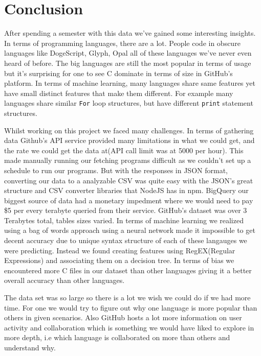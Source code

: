 \documentclass[11pt]{article}
\begin{document}
    \hypertarget{conclusion}{%
\section{Conclusion}\label{conclusion}}

After spending a semester with this data we've gained some interesting
insights. In terms of programming languages, there are a lot. People
code in obscure languages like DogeScript, Glyph, Opal all of these
languages we've never even heard of before. The big languages are still
the most popular in terms of usage but it's surprising for one to see C
dominate in terms of size in GitHub's platform. In terms of machine
learning, many languages share same features yet have small distinct
features that make them different. For example many languages share
similar \texttt{For} loop structures, but have different \texttt{print}
statement structures.

Whilst working on this project we faced many challenges. In terms of
gathering data Github's API service provided many limitations in what we
could get, and the rate we could get the data at(API call limit was at
5000 per hour). This made manually running our fetching programs
difficult as we couldn't set up a schedule to run our programs. But with
the responses in JSON format, converting our data to a analyzable CSV
was quite easy with the JSON's great structure and CSV converter
libraries that NodeJS has in npm. BigQuery our biggest source of data
had a monetary impedment where we would need to pay \$5 per every
terabyte queried from their service. GitHub's dataset was over 3
Terabytes total, tables sizes varied. In terms of machine learning we
realized using a bag of words approach using a neural network made it
impossible to get decent accuracy due to unique syntax structure of each
of these langauges we were predicting. Instead we found creating
features using RegEX(Regular Expressions) and associating them on a
decision tree. In terms of bias we encountered more C files in our
dataset than other languages giving it a better overall accuracy than
other languages.

The data set was so large so there is a lot we wish we could do if we
had more time. For one we would try to figure out why one language is
more popular than others in given scenarios. Also GitHub hosts a lot
more information on user activity and collaboration which is something
we would have liked to explore in more depth, i.e which language is
collaborated on more than others and understand why.
\end{document}
